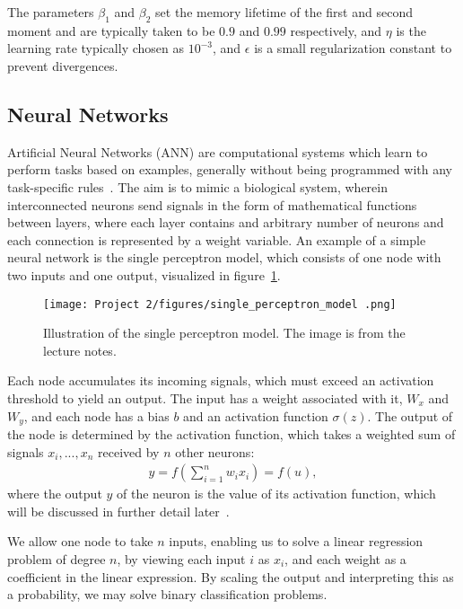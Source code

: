 \documentclass[english,notitlepage,reprint,nofootinbib]{revtex4-2}  %
\begin{document}
The parameters $\beta_1$ and $\beta_2$ set the memory lifetime of the first and second moment and are typically taken to be $0.9$ and $0.99$ respectively, and $\eta$ is the learning rate typically chosen as $10^{-3}$, and $\epsilon$ is a small regularization constant to prevent divergences. 



\subsection*{Neural Networks}%
Artificial Neural Networks (ANN) are computational systems which learn to perform tasks based on examples, generally without being programmed with any task-specific rules~\cite{friedman}. 
The aim is to mimic a biological system, wherein interconnected neurons send signals in the form of mathematical functions between layers, where each layer contains and arbitrary number of neurons and each connection is represented by a weight variable. An example of a simple neural network is the single perceptron model, which consists of one node with two inputs and one output, visualized in figure~\ref{fig: Single Perceptron Model}. 

\begin{figure}[h!]
    \centering %
    \texttt{[image: Project 2/figures/single\_perceptron\_model .png]} 
    \caption{Illustration of the single perceptron model. The image is from the lecture notes.}
    \label{fig: Single Perceptron Model}
\end{figure}

Each node accumulates its incoming signals, which must exceed an activation threshold to yield an output. The input has a weight associated with it, $W_x$ and $W_y$, and each node has a bias $b$ and an activation function $\sigma(z)$. 
The output of the node is determined by the activation function, which takes a weighted sum of signals $x_i,...,x_n$ received by $n$ other neurons: 
\begin{align}
    y = f\left(\sum\limits_{i=1}^n w_i x_i\right) = f(u), 
\end{align}
where the output $y$ of the neuron is the value of its activation function, which will be discussed in further detail later~\cite{lecture_notes}. %

We allow one node to take $n$ inputs, enabling us to solve a linear regression problem of degree $n$, by viewing each input $i$ as $x_i$, and each weight as a coefficient in the linear expression. By scaling the output and interpreting this as a probability, we may solve binary classification problems. 
\end{document}
